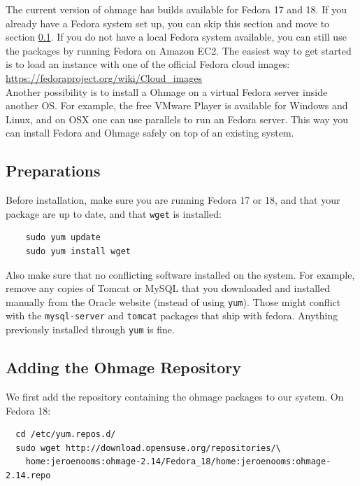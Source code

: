 \documentclass{scrartcl}
\begin{document}
The current version of ohmage has builds available for Fedora 17 and 18.
If you already have a Fedora system set up, you can skip this section and
move to section \ref{preparations}.
If you do not have a local Fedora system available, you can still use
the packages by running Fedora on Amazon EC2. The easiest way to get started is
to load an instance with one of the official Fedora cloud images: \\

\url{https://fedoraproject.org/wiki/Cloud_images} \\

\noindent Another possibility is to install a Ohmage on a virtual Fedora server
inside another OS. For example, the free VMware Player is available for Windows 
and Linux, and on OSX one can use parallels to run an Fedora server. This way
you can install Fedora and Ohmage safely on top of an existing system.

\subsection{Preparations}
\label{preparations}

Before installation, make sure you are running Fedora 17 or 18, and that your
package are up to date, and that \texttt{wget} is installed:

\begin{verbatim}
    sudo yum update
    sudo yum install wget
\end{verbatim}

\noindent Also make sure that no conflicting software installed on the system.
For example, remove any copies of Tomcat or MySQL that you downloaded and
installed manually from the Oracle website (instead of using \texttt{yum}).
Those might conflict with the \texttt{mysql-server} and \texttt{tomcat}
packages that ship with fedora. Anything previously installed through
\texttt{yum} is fine.

\subsection{Adding the Ohmage Repository}

We first add the repository containing the ohmage packages to our system. On
Fedora 18:

\begin{verbatim}
  cd /etc/yum.repos.d/
  sudo wget http://download.opensuse.org/repositories/\
    home:jeroenooms:ohmage-2.14/Fedora_18/home:jeroenooms:ohmage-2.14.repo
\end{verbatim}
\end{document}
